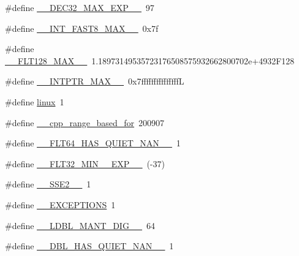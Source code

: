 \begin{DoxyCompactItemize}
\item 
\#define \hyperlink{cmake-build-debug_2babel__client__autogen_2moc__predefs_8h_aabb9dbf55546af708a50831a7c48d9b9}{\+\_\+\+\_\+\+D\+E\+C32\+\_\+\+M\+A\+X\+\_\+\+E\+X\+P\+\_\+\+\_\+}~97
\item 
\#define \hyperlink{cmake-build-debug_2babel__client__autogen_2moc__predefs_8h_ab11d0b7a18b7d57dff361c0848f28e09}{\+\_\+\+\_\+\+I\+N\+T\+\_\+\+F\+A\+S\+T8\+\_\+\+M\+A\+X\+\_\+\+\_\+}~0x7f
\item 
\#define \hyperlink{cmake-build-debug_2babel__client__autogen_2moc__predefs_8h_a3e026eb4d36813e9c8ae788b0165bfc3}{\+\_\+\+\_\+\+F\+L\+T128\+\_\+\+M\+A\+X\+\_\+\+\_\+}~1.\+18973149535723176508575932662800702e+4932\+F128
\item 
\#define \hyperlink{cmake-build-debug_2babel__client__autogen_2moc__predefs_8h_ae19860f43757eb1fc151b38cb3bbc278}{\+\_\+\+\_\+\+I\+N\+T\+P\+T\+R\+\_\+\+M\+A\+X\+\_\+\+\_\+}~0x7fffffffffffffffL
\item 
\#define \hyperlink{cmake-build-debug_2babel__client__autogen_2moc__predefs_8h_aa092b0d4c1d4d4407b97024f6cb2820c}{linux}~1
\item 
\#define \hyperlink{cmake-build-debug_2babel__client__autogen_2moc__predefs_8h_a84ca4631d4b617a6dcb94faa40235701}{\+\_\+\+\_\+cpp\+\_\+range\+\_\+based\+\_\+for}~200907
\item 
\#define \hyperlink{cmake-build-debug_2babel__client__autogen_2moc__predefs_8h_a868c5b1405b26bc9592fa9f3248e99aa}{\+\_\+\+\_\+\+F\+L\+T64\+\_\+\+H\+A\+S\+\_\+\+Q\+U\+I\+E\+T\+\_\+\+N\+A\+N\+\_\+\+\_\+}~1
\item 
\#define \hyperlink{cmake-build-debug_2babel__client__autogen_2moc__predefs_8h_a1f4c572c6b5b4fe3e7c81bc48272e56b}{\+\_\+\+\_\+\+F\+L\+T32\+\_\+\+M\+I\+N\+\_\+\_\+\+E\+X\+P\+\_\+\+\_\+}~(-\/37)
\item 
\#define \hyperlink{cmake-build-debug_2babel__client__autogen_2moc__predefs_8h_a88cd3f961f8705563745c43024377efa}{\+\_\+\+\_\+\+S\+S\+E2\+\_\+\+\_\+}~1
\item 
\#define \hyperlink{cmake-build-debug_2babel__client__autogen_2moc__predefs_8h_a260281f3f3cd1c287fce0d5bb737febb}{\+\_\+\+\_\+\+E\+X\+C\+E\+P\+T\+I\+O\+NS}~1
\item 
\#define \hyperlink{cmake-build-debug_2babel__client__autogen_2moc__predefs_8h_a3c8df97b7413f417379377b604d060f5}{\+\_\+\+\_\+\+L\+D\+B\+L\+\_\+\+M\+A\+N\+T\+\_\+\+D\+I\+G\+\_\+\+\_\+}~64
\item 
\#define \hyperlink{cmake-build-debug_2babel__client__autogen_2moc__predefs_8h_a5e816b71154141be2784accabcdc0ead}{\+\_\+\+\_\+\+D\+B\+L\+\_\+\+H\+A\+S\+\_\+\+Q\+U\+I\+E\+T\+\_\+\+N\+A\+N\+\_\+\+\_\+}~1

\end{DoxyCompactItemize}
